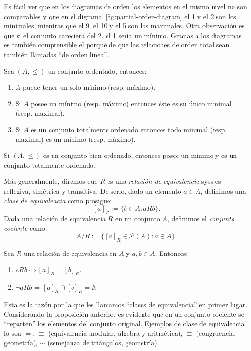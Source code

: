 \documentclass[11pt,a4paper]{book}
\renewcommand{\P}{\mathcal{P}}
\begin{document}
Es fácil ver que en los diagramas de orden los elementos en el mismo nivel no son comparables y que en el digrama~\ref{fig:partial-order-diagram} el 1 y el 2 son los minimales, mientras que el 9, el 10 y el 5 son los maximales. Otra observación es que si el conjunto careciera del 2, el 1 sería un mínimo. Gracias a los diagramas es también comprensible el porqué de que las relaciones de orden total sean también llamadas ``de orden lineal''.
\begin{prop}
	Sea $(A,\leq)$ un conjunto ordentado, entonces:
	\begin{enumerate}
		\item $A$ puede tener un solo mínimo (resp. máximo).
		\item Si $A$ posee un mínimo (resp. máximo) entonces éste es su único minimal (resp. maximal).
		\item Si $A$ es un conjunto totalmente ordenado entonces todo minimal (resp. maximal) es un mínimo (resp. máximo).
	\end{enumerate}
\end{prop}
\begin{prop}
	Si $(A,\leq)$ es un conjunto bien ordenado, entonces posee un mínimo y es un conjunto totalmente ordenado.
\end{prop}

	Más generalmente, diremos que $R$ es una \textit{relación de equivalencia} syss es reflexiva, simétrica y transitiva. De serlo, dado un elemento $a\in A$, definimos una \textit{clase de equivalencia} como prosigue:
	$$[a]_R:=\{b\in A:aRb\}.$$
	Dada una relación de equivalencia $R$ en un conjunto $A$, definimos el \textit{conjunto cociente} como:
	$$A/R:=\{[a]_R\in\P(A):a\in A\}.$$
\begin{prop}
	Sea $R$ una relación de equivalencia en $A$ y $a,b\in A$. Entonces:
	\begin{enumerate}[$a)$]
		\item $aRb\iff [a]_R=[b]_R$.
		\item $\neg aRb\iff [a]_R\cap[b]_R=\emptyset$.
	\end{enumerate}
\end{prop}
Esta es la razón por la que les llamamos ``clases de equivalencia'' en primer lugar. Considerando la proposición anterior, es evidente que en un conjunto cociente se ``reparten'' los elementos del conjunto original. Ejemplos de clase de equivalencia lo son $=$, $\equiv$ (equivalencia modular, álgebra y aritmética), $\equiv$ (congruencia, geometría), $\sim$ (semejanza de triángulos, geometría).
\end{document}
